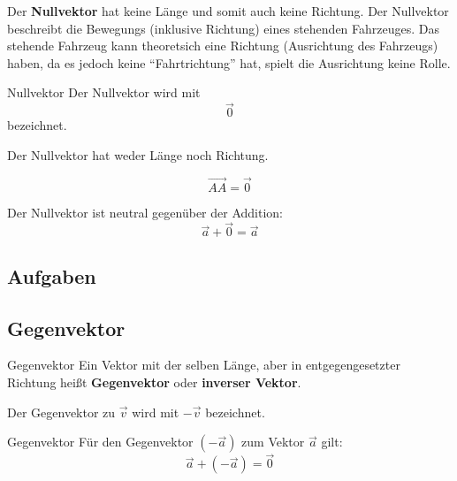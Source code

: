 Der \textbf{Nullvektor} hat keine Länge und somit auch keine
Richtung. Der Nullvektor beschreibt \zB die Bewegungs (inklusive
Richtung) eines stehenden Fahrzeuges.
Das stehende Fahrzeug kann theoretsich eine Richtung (Ausrichtung des
Fahrzeugs) haben, da es jedoch keine ``Fahrtrichtung'' hat, spielt die
Ausrichtung keine Rolle.

\begin{definition}{Nullvektor}{}
  Der Nullvektor wird mit
  $$\vec{0}$$
  bezeichnet.

  Der Nullvektor hat weder Länge noch Richtung.
\end{definition}

\begin{gesetz}{}{}
  $$\overrightarrow{AA} = \vec{0}$$
  \end{gesetz}

\begin{bemerkung}{}{}
  Der Nullvektor ist neutral gegenüber der Addition:
  $$\vec{a} + \vec{0}  = \vec{a}$$
\end{bemerkung}

\subsection*{Aufgaben}

\newpage


\subsection{Gegenvektor}

\begin{definition}{Gegenvektor}{}
  Ein Vektor mit der selben Länge, aber in entgegengesetzter Richtung
  heißt \textbf{Gegenvektor} oder \textbf{inverser Vektor}.

  Der Gegenvektor zu $\vec{v}$ wird mit $-\vec{v}$ bezeichnet.
\end{definition}

\begin{bemerkung}{Gegenvektor}{}
  Für den Gegenvektor $(-\vec{a})$ zum Vektor $\vec{a}$ gilt:
  $$\vec{a} + (-\vec{a}) = \vec{0}$$
  
\end{bemerkung}


